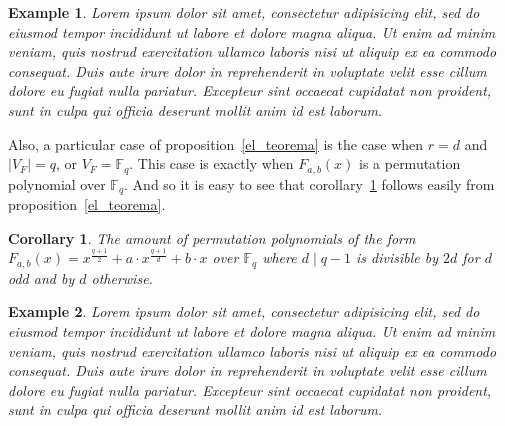 \documentclass[landscape,final,paperwidth=48in,paperheight=38in]{baposter}
\newtheorem{corollary}{Corollary}
\newtheorem{example}{Example}
\begin{document}
\begin{poster}
{\begin{multicols}{2}
    \begin{example}
      Lorem ipsum dolor sit amet, consectetur adipisicing elit, sed do eiusmod
      tempor incididunt ut labore et dolore magna aliqua. Ut enim ad minim veniam,
      quis nostrud exercitation ullamco laboris nisi ut aliquip ex ea commodo
      consequat. Duis aute irure dolor in reprehenderit in voluptate velit esse
      cillum dolore eu fugiat nulla pariatur. Excepteur sint occaecat cupidatat non
      proident, sunt in culpa qui officia deserunt mollit anim id est laborum.
    \end{example}

    Also, a particular case of proposition~\ref{el_teorema} is the case when $r=d$ and $\left\vert V_{F} \right\vert = q$, or $V_{F} = \mathbb{F}_{q}$. This case is exactly when $F_{a,b}(x)$ is a permutation polynomial over $\mathbb{F}_{q}$. And so it is easy to see that corollary~\ref{cantidad_pp} follows easily from proposition~\ref{el_teorema}.

    \begin{corollary}\label{cantidad_pp}
      The amount of permutation polynomials of the form $F_{a,b}(x) = x^{\frac{q+1}{2}} + a\cdot x^{\frac{q+1}{d}} + b\cdot x$ over $\mathbb{F}_{q}$ where $d \mid q-1$ is divisible by $2d$ for $d$ odd and by $d$ otherwise.
    \end{corollary}

    \begin{example}
      Lorem ipsum dolor sit amet, consectetur adipisicing elit, sed do eiusmod
      tempor incididunt ut labore et dolore magna aliqua. Ut enim ad minim veniam,
      quis nostrud exercitation ullamco laboris nisi ut aliquip ex ea commodo
      consequat. Duis aute irure dolor in reprehenderit in voluptate velit esse
      cillum dolore eu fugiat nulla pariatur. Excepteur sint occaecat cupidatat non
      proident, sunt in culpa qui officia deserunt mollit anim id est laborum.
    \end{example}

  \end{multicols}
   \vspace{0.3em}
  }\label{Conditions for PP}


\end{poster}
\end{document}

